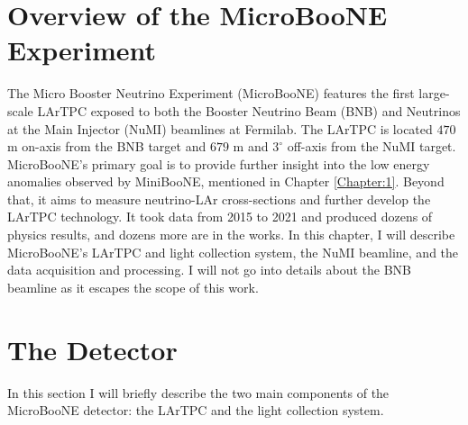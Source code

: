 \section{Overview of the MicroBooNE Experiment}
\label{Chapter:2}
The Micro Booster Neutrino Experiment (MicroBooNE) features the first large-scale LArTPC exposed to both the Booster Neutrino Beam (BNB) and Neutrinos at the Main Injector (NuMI) beamlines at Fermilab. The LArTPC is located $470$ m on-axis from the BNB target and $679$ m and $3^{\circ}$ off-axis from the NuMI target. MicroBooNE's primary goal is to provide further insight into the low energy anomalies observed by MiniBooNE, mentioned in Chapter \ref{Chapter:1}. Beyond that, it aims to measure neutrino-LAr cross-sections and further develop the LArTPC technology. It took data from 2015 to 2021 and produced dozens of physics results, and dozens more are in the works. 
In this chapter, I will describe MicroBooNE's LArTPC and light collection system, the NuMI beamline, and the data acquisition and processing. I will not go into details about the BNB beamline as it escapes the scope of this work.
%
\section{The Detector}
%
In this section I will briefly describe the two main components of the MicroBooNE detector: the LArTPC and the light collection system.
